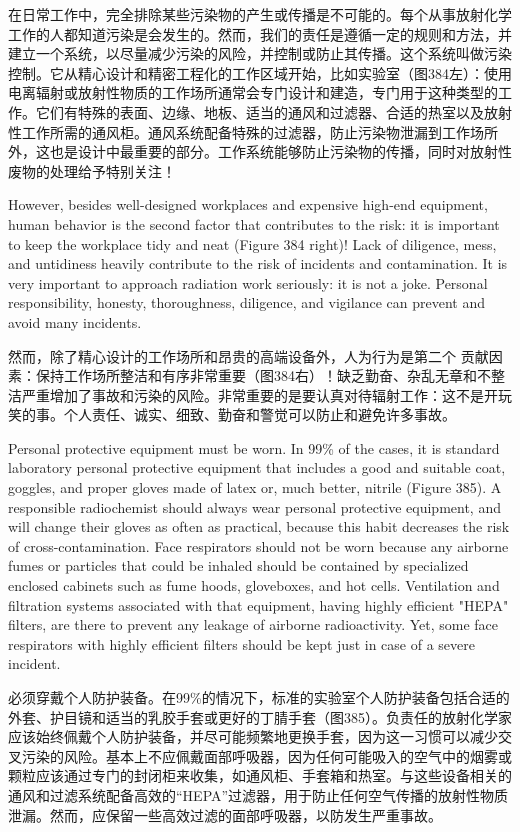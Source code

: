 \documentclass[dvipsnames, svgnames,a4paper,11pt]{article}
\begin{document}
在日常工作中，完全排除某些污染物的产生或传播是不可能的。每个从事放射化学工作的人都知道污染是会发生的。然而，我们的责任是遵循一定的规则和方法，并建立一个系统，以尽量减少污染的风险，并控制或防止其传播。这个系统叫做污染控制。它从精心设计和精密工程化的工作区域开始，比如实验室（图384左）：使用电离辐射或放射性物质的工作场所通常会专门设计和建造，专门用于这种类型的工作。它们有特殊的表面、边缘、地板、适当的通风和过滤器、合适的热室以及放射性工作所需的通风柜。通风系统配备特殊的过滤器，防止污染物泄漏到工作场所外，这也是设计中最重要的部分。工作系统能够防止污染物的传播，同时对放射性废物的处理给予特别关注！

However, besides well-designed workplaces and expensive high-end equipment, human behavior is the second factor that contributes to the risk: it is important to keep the workplace tidy and neat (Figure 384 right)! Lack of diligence, mess, and untidiness heavily contribute to the risk of incidents and contamination. It is very important to approach radiation work seriously: it is not a joke. Personal responsibility, honesty, thoroughness, diligence, and vigilance can prevent and avoid many incidents.


然而，除了精心设计的工作场所和昂贵的高端设备外，人为行为是第二个 贡献因素：保持工作场所整洁和有序非常重要（图384右）！缺乏勤奋、杂乱无章和不整洁严重增加了事故和污染的风险。非常重要的是要认真对待辐射工作：这不是开玩笑的事。个人责任、诚实、细致、勤奋和警觉可以防止和避免许多事故。

Personal protective equipment must be worn. In 99\% of the cases, it is standard laboratory personal protective equipment that includes a good and suitable coat, goggles, and proper gloves made of latex or, much better, nitrile (Figure 385). A responsible radiochemist should always wear personal protective equipment, and will change their gloves as often as practical, because this habit decreases the risk of cross-contamination. Face respirators should not be worn because any airborne fumes or particles that could be inhaled should be contained by specialized enclosed cabinets such as fume hoods, gloveboxes, and hot cells. Ventilation and filtration systems associated with that equipment, having highly efficient "HEPA" filters, are there to prevent any leakage of airborne radioactivity. Yet, some face respirators with highly efficient filters should be kept just in case of a severe incident.

必须穿戴个人防护装备。在99\%的情况下，标准的实验室个人防护装备包括合适的外套、护目镜和适当的乳胶手套或更好的丁腈手套（图385）。负责任的放射化学家应该始终佩戴个人防护装备，并尽可能频繁地更换手套，因为这一习惯可以减少交叉污染的风险。基本上不应佩戴面部呼吸器，因为任何可能吸入的空气中的烟雾或颗粒应该通过专门的封闭柜来收集，如通风柜、手套箱和热室。与这些设备相关的通风和过滤系统配备高效的“HEPA”过滤器，用于防止任何空气传播的放射性物质泄漏。然而，应保留一些高效过滤的面部呼吸器，以防发生严重事故。
\end{document}
